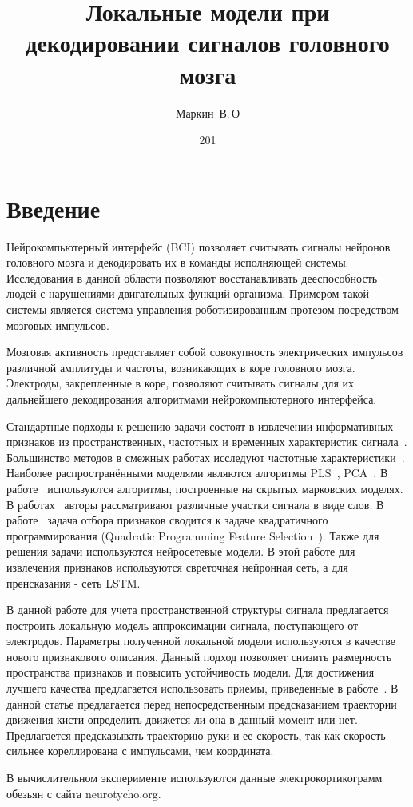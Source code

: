 \documentclass[12pt,twoside]{article}
\title{
Локальные модели при декодировании сигналов головного мозга}
\author{Маркин~В.\,О}
\date{201}
\begin{document}
\bigskip
\bigskip\bigskip
\maketitle
\bigskip
\section{Введение}
Нейрокомпьютерный интерфейс (BCI) позволяет считывать сигналы нейронов головного мозга и декодировать их в команды исполняющей системы. Исследования в данной области позволяют восстанавливать дееспособность людей с нарушениями двигательных функций организма. Примером такой системы является система управления роботизированным протезом посредством мозговых импульсов. 

Мозговая активность представляет собой совокупность электрических импульсов различной амплитуды и частоты, возникающих в коре головного мозга. Электроды, закрепленные в коре, позволяют считывать сигналы для их дальнейшего декодирования алгоритмами нейрокомпьютерного интерфейса.

Стандартные подходы к решению задачи состоят в извлечении информативных признаков из пространственных, частотных и временных характеристик сигнала~\cite{Morishita2014,Alexander2013}. Большинство методов в смежных работах исследуют частотные характеристики~\cite{Chin2007,Eliseyev2014,Loza2017}. Наиболее распространёнными моделями являются алгоритмы PLS~\cite{Rosipal2006,Eliseyev2016,Eliseyev2014}, PCA~\cite{Zhao2010,Song2017}. В работе~\cite{Zhao2014} используются алгоритмы, построенные на скрытых марковских моделях. В  работах~\cite{Loza2017,Song2017} авторы рассматривают различные участки сигнала в виде слов. В работе~\cite{Strijov2018} задача отбора признаков сводится к задаче квадратичного программирования (Quadratic Programming Feature Selection~\cite{rodriguez2010quadratic}).
Также для решения задачи используются нейросетевые модели\cite{Xie2018DeepLA}. В этой работе для извлечения признаков используются свреточная нейронная сеть, а для пренсказания - сеть LSTM.

В данной работе для учета пространственной структуры сигнала предлагается построить локальную модель аппроксимации сигнала, поступающего от электродов. Параметры полученной локальной модели используются в качестве нового признакового описания. Данный подход позволяет снизить размерность пространства признаков и повысить устойчивость модели. Для достижения лучшего качества предлагается использовать приемы, приведенные в работе~\cite{Bundy2016}. В данной статье предлагается перед непосредственным предсказанием траектории движения кисти определить движется ли она в данный момент или нет. Предлагается предсказывать траекторию руки и ее скорость, так как скорость сильнее кореллирована с импульсами, чем координата.

В вычислительном эксперименте используются данные электрокортикограмм обезьян с сайта neurotycho.org.




\end{document}
